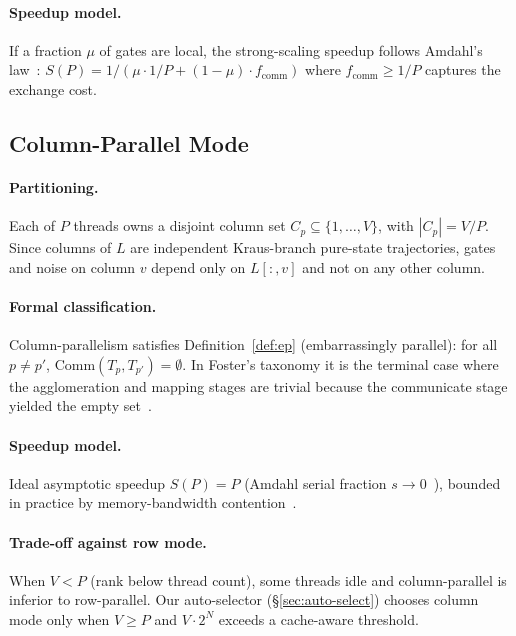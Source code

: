 \documentclass[11pt,a4paper]{article}
\begin{document}
\paragraph{Speedup model.}
If a fraction $\mu$ of gates are local, the strong-scaling speedup follows
Amdahl's law~\cite{amdahl1967}: $S(P) = 1/(\mu \cdot 1/P + (1-\mu)\cdot f_{\mathrm{comm}})$
where $f_{\mathrm{comm}} \ge 1/P$ captures the exchange cost.

\subsection{Column-Parallel Mode}
\label{sec:col-parallel}

\paragraph{Partitioning.}
Each of $P$ threads owns a disjoint column set $C_p \subseteq \{1,\ldots,V\}$, with
$|C_p| = V/P$. Since columns of $L$ are independent Kraus-branch pure-state
trajectories, gates and noise on column $v$ depend only on $L[:,v]$ and not on any
other column.

\paragraph{Formal classification.}
Column-parallelism satisfies Definition~\ref{def:ep} (embarrassingly parallel): for all
$p \neq p'$, $\mathrm{Comm}(T_p, T_{p'}) = \emptyset$. In Foster's taxonomy it is the
terminal case where the agglomeration and mapping stages are trivial because the
communicate stage yielded the empty set~\cite{foster1995,wilkinson2005}.

\paragraph{Speedup model.}
Ideal asymptotic speedup $S(P) = P$ (Amdahl serial fraction
$s \to 0$~\cite{amdahl1967}), bounded in practice by memory-bandwidth
contention~\cite{hennessypatterson2017}.

\paragraph{Trade-off against row mode.}
When $V < P$ (rank below thread count), some threads idle and column-parallel is
inferior to row-parallel. Our auto-selector (\S\ref{sec:auto-select}) chooses column
mode only when $V \ge P$ and $V \cdot 2^N$ exceeds a cache-aware threshold.
\end{document}
